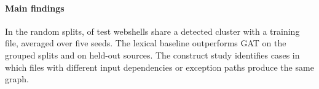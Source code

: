 \paragraph{Main findings}
In the random splits,  of test webshells share a detected cluster with a training
file, averaged over five seeds. The lexical baseline outperforms GAT on the grouped splits and on held-out
sources. The construct study identifies cases in which files with different input dependencies or exception
paths produce the same graph.
